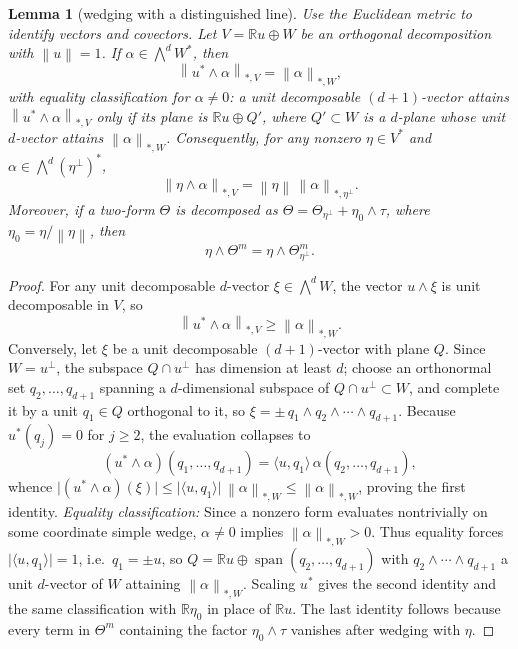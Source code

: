 \documentclass[11pt]{article}
\newtheorem{lemma}[theorem]{Lemma}
\newcommand{\R}{\mathbb{R}}
\newcommand{\norm}[1]{\left\|#1\right\|}
\begin{document}
\begin{lemma}[wedging with a distinguished line]
\label{lem:wedge-line}
Use the Euclidean metric to identify vectors and covectors.
Let \(V=\R u\oplus W\) be an orthogonal decomposition with \(\norm{u}=1\).
If \(\alpha\in\bigwedge^d W^*\), then
\[
  \norm{u^*\wedge\alpha}_{*,V}=\norm{\alpha}_{*,W},
\]
with equality classification for \(\alpha\neq0\): a unit decomposable \((d+1)\)-vector attains
\(\norm{u^*\wedge\alpha}_{*,V}\) only if its plane is \(\R u\oplus Q'\), where
\(Q'\subset W\) is a \(d\)-plane whose unit \(d\)-vector attains
\(\norm{\alpha}_{*,W}\).
Consequently, for any nonzero \(\eta\in V^*\) and
\(\alpha\in\bigwedge^d(\eta^\perp)^*\),
\[
  \norm{\eta\wedge\alpha}_{*,V}
  =
  \norm{\eta}\,\norm{\alpha}_{*,\eta^\perp}.
\]
Moreover, if a two-form \(\Theta\) is decomposed as
\(\Theta=\Theta_{\eta^\perp}+\eta_0\wedge\tau\), where
\(\eta_0=\eta/\norm{\eta}\), then
\[
  \eta\wedge\Theta^m=\eta\wedge\Theta_{\eta^\perp}^m.
\]
\end{lemma}

\begin{proof}
For any unit decomposable \(d\)-vector \(\xi\in\bigwedge^d W\), the vector
\(u\wedge\xi\) is unit decomposable in \(V\), so
\[
  \norm{u^*\wedge\alpha}_{*,V}\geq\norm{\alpha}_{*,W}.
\]
Conversely, let \(\xi\) be a unit decomposable \((d+1)\)-vector with plane
\(Q\). Since \(W=u^\perp\), the subspace \(Q\cap u^\perp\) has dimension at
least \(d\); choose an orthonormal set \(q_2,\dots,q_{d+1}\) spanning a
\(d\)-dimensional subspace of \(Q\cap u^\perp\subset W\), and complete it by a
unit \(q_1\in Q\) orthogonal to it, so
\(\xi=\pm\,q_1\wedge q_2\wedge\cdots\wedge q_{d+1}\). Because
\(u^*(q_j)=0\) for \(j\ge2\), the evaluation collapses to
\[
  (u^*\wedge\alpha)(q_1,\dots,q_{d+1})
  =\langle u,q_1\rangle\,\alpha(q_2,\dots,q_{d+1}),
\]
whence
\(\bigl|(u^*\wedge\alpha)(\xi)\bigr|
\le\lvert\langle u,q_1\rangle\rvert\,\norm{\alpha}_{*,W}
\le\norm{\alpha}_{*,W}\), proving the first identity. \emph{Equality
classification:} Since a nonzero form evaluates nontrivially on some
coordinate simple wedge, \(\alpha\neq0\) implies \(\norm{\alpha}_{*,W}>0\). Thus equality forces
\(\lvert\langle u,q_1\rangle\rvert=1\), i.e.\ \(q_1=\pm u\), so
\(Q=\R u\oplus\operatorname{span}(q_2,\dots,q_{d+1})\) with
\(q_2\wedge\cdots\wedge q_{d+1}\) a unit \(d\)-vector of \(W\) attaining
\(\norm{\alpha}_{*,W}\). Scaling \(u^*\) gives the second identity and the
same classification with \(\R\eta_0\) in place of \(\R u\).  The last
identity follows because every term in \(\Theta^m\) containing the factor
\(\eta_0\wedge\tau\) vanishes after wedging with \(\eta\).
\end{proof}
\end{document}
